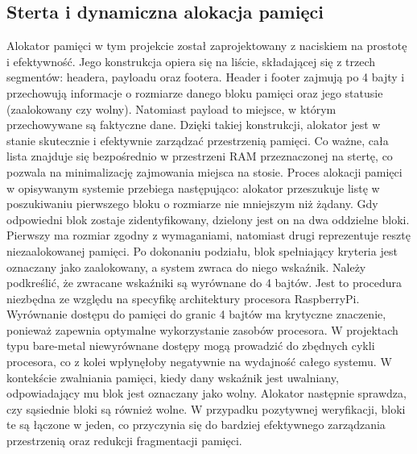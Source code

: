 \documentclass[shortabstract]{iithesis}
\begin{document}
\subsection{Sterta i dynamiczna alokacja pamięci}
Alokator pamięci w tym projekcie został zaprojektowany z naciskiem na prostotę i efektywność. Jego konstrukcja opiera się na liście, składającej się z trzech segmentów: headera, payloadu oraz footera. Header i footer zajmują po 4 bajty i przechowują informacje o rozmiarze danego bloku pamięci oraz jego statusie (zaalokowany czy wolny). Natomiast payload to miejsce, w którym przechowywane są faktyczne dane. Dzięki takiej konstrukcji, alokator jest w stanie skutecznie i efektywnie zarządzać przestrzenią pamięci. Co ważne, cała lista znajduje się bezpośrednio w przestrzeni RAM przeznaczonej na stertę, co pozwala na minimalizację zajmowania miejsca na stosie. 
Proces alokacji pamięci w opisywanym systemie przebiega następująco: alokator przeszukuje listę w poszukiwaniu pierwszego bloku o rozmiarze nie mniejszym niż żądany. Gdy odpowiedni blok zostaje zidentyfikowany, dzielony jest on na dwa oddzielne bloki. Pierwszy ma rozmiar zgodny z wymaganiami, natomiast drugi reprezentuje resztę niezaalokowanej pamięci. Po dokonaniu podziału, blok spełniający kryteria jest oznaczany jako zaalokowany, a system zwraca do niego wskaźnik.
Należy podkreślić, że zwracane wskaźniki są wyrównane do 4 bajtów. Jest to procedura niezbędna ze względu na specyfikę architektury procesora RaspberryPi. Wyrównanie dostępu do pamięci do granic 4 bajtów ma krytyczne znaczenie, ponieważ zapewnia optymalne wykorzystanie zasobów procesora. W projektach typu bare-metal niewyrównane dostępy mogą prowadzić do zbędnych cykli procesora, co z kolei wpłynęłoby negatywnie na wydajność całego systemu.
W kontekście zwalniania pamięci, kiedy dany wskaźnik jest uwalniany, odpowiadający mu blok jest oznaczany jako wolny. Alokator następnie sprawdza, czy sąsiednie bloki są również wolne. W przypadku pozytywnej weryfikacji, bloki te są łączone w jeden, co przyczynia się do bardziej efektywnego zarządzania przestrzenią oraz redukcji fragmentacji pamięci.
\end{document}
